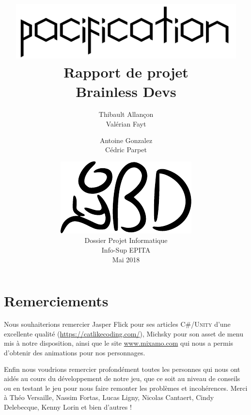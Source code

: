 \documentclass[12pt]{report}
\begin{document}
\title{
	{\vspace{3em}\protect\centering\protect\includegraphics[width=0.9\textwidth]{Pacification_logo}}\\
	{\vspace{4em}\Huge Rapport de projet}\\
	{\large Brainless Devs}
}
\author{
	Thibault Allançon\\
	Valérian Fayt
	\and
	Antoine Gonzalez\\
	Cédric Parpet}
\date{
	{\vfill\protect\centering\protect\includegraphics{brainless_devs.pdf}}\\
	Dossier Projet Informatique\\
	Info-Sup EPITA\\
	Mai 2018
}

\maketitle
\tableofcontents

\chapter{Remerciements}

Nous souhaiterions remercier Jasper Flick pour ses articles C\#/\textsc{Unity}
d'une excellente qualité (\url{https://catlikecoding.com/}), Michsky pour son
asset de menu mis à notre disposition, ainsi que le site \url{www.mixamo.com}
qui nous a permis d’obtenir des animations pour nos personnages.

Enfin nous voudrions remercier profondément toutes les personnes qui nous ont
aidés au cours du développement de notre jeu, que ce soit au niveau de conseils
ou en testant le jeu pour nous faire remonter les problèmes et incohérences.
Merci à Théo Versaille, Nassim Fortas, Lucas Ligny, Nicolas Cantaert, Cindy
Delebecque, Kenny Lorin et bien d'autres !
\end{document}
